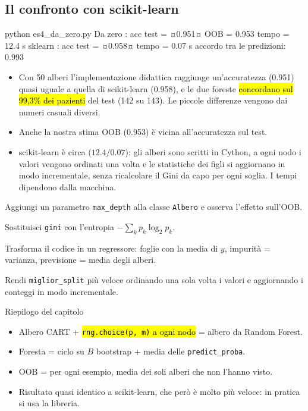 \subsection{Il confronto con scikit-learn}


\begin{terminale}{python es4_da_zero.py}
Da zero : acc test = ¤0.951¤  OOB = 0.953  tempo = 12.4 s
sklearn : acc test = ¤0.958¤  tempo = 0.07 s
accordo tra le predizioni: 0.993
\end{terminale}

\begin{esempio}[Interpretazione]
\begin{itemize}
  \item Con 50 alberi l'implementazione didattica raggiunge un'accuratezza (0.951) quasi uguale a quella di scikit-learn (0.958), e le due foreste \hl{concordano sul 99{,}3\% dei pazienti} del test (142 su 143). Le piccole differenze vengono dai numeri casuali diversi.
  \item Anche la nostra stima OOB (0.953) è vicina all'accuratezza sul test.
  \item scikit-learn è circa  ($12.4/0.07$): gli alberi sono scritti in Cython, a ogni nodo i valori vengono ordinati una volta e le statistiche dei figli si aggiornano in modo incrementale, senza ricalcolare il Gini da capo per ogni soglia. I tempi dipendono dalla macchina.
\end{itemize}
\end{esempio}

\begin{mlbox}
\begin{passi}
  \item Aggiungi un parametro \texttt{max\_depth} alla classe \texttt{Albero} e osserva l'effetto sull'OOB.
  \item Sostituisci \texttt{gini} con l'entropia $-\sum_k p_k\log_2 p_k$.
  \item Trasforma il codice in un regressore: foglie con la media di $y$, impurità = varianza, previsione = media degli alberi.
  \item Rendi \texttt{miglior\_split} più veloce ordinando una sola volta i valori e aggiornando i conteggi in modo incrementale.
\end{passi}
\end{mlbox}

\begin{appunti}{Riepilogo del capitolo}
\begin{itemize}
  \item Albero CART + \hl{\texttt{rng.choice(p, m)} a ogni nodo} = albero da Random Forest.
  \item Foresta = ciclo su $B$ bootstrap + media delle \texttt{predict\_proba}.
  \item OOB = per ogni esempio, media dei soli alberi che non l'hanno visto.
  \item Risultato quasi identico a scikit-learn, che però è molto più veloce: in pratica si usa la libreria.
\end{itemize}
\end{appunti}
